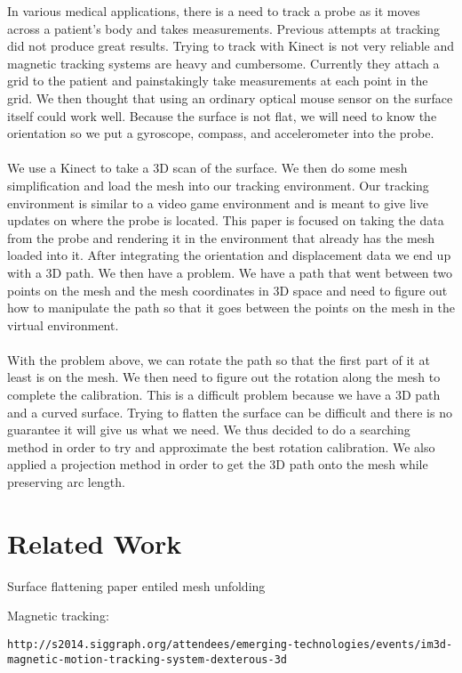 \documentclass[11pt,psfig]{article}
\begin{document}
In various medical applications, there is a need to track a probe as it moves across a patient's body and takes measurements. Previous attempts at tracking did not produce great results. Trying to track with Kinect is not very reliable and magnetic tracking systems are heavy and cumbersome. Currently they attach a grid to the patient and painstakingly take measurements at each point in the grid. We then thought that using an ordinary optical mouse sensor on the surface itself could work well. Because the surface is not flat, we will need to know the orientation so we put a gyroscope, compass, and accelerometer into the probe. \\
\\
We use a Kinect to take a 3D scan of the surface. We then do some mesh simplification and load the mesh into our tracking environment. Our tracking environment is similar to a video game environment and is meant to give live updates on where the probe is located. This paper is focused on taking the data from the probe and rendering it in the environment that already has the mesh loaded into it. After integrating the orientation and displacement data we end up with a 3D path. We then have a problem. We have a path that went between two points on the mesh and the mesh coordinates in 3D space and need to figure out how to manipulate the path so that it goes between the points on the mesh in the virtual environment. \\
\\
With the problem above, we can rotate the path so that the first part of it at least is on the mesh. We then need to figure out the rotation along the mesh to complete the calibration. This is a difficult problem because we have a 3D path and a curved surface. Trying to flatten the surface can be difficult and there is no guarantee it will give us what we need. We thus decided to do a searching method in order to try and approximate the best rotation calibration. We also applied a projection method in order to get the 3D path onto the mesh while preserving arc length. 

\section*{Related Work}

Surface flattening paper entiled mesh unfolding

Magnetic tracking:
\begin{verbatim}
http://s2014.siggraph.org/attendees/emerging-technologies/events/im3d-magnetic-motion-tracking-system-dexterous-3d
\end{verbatim}
\end{document}
